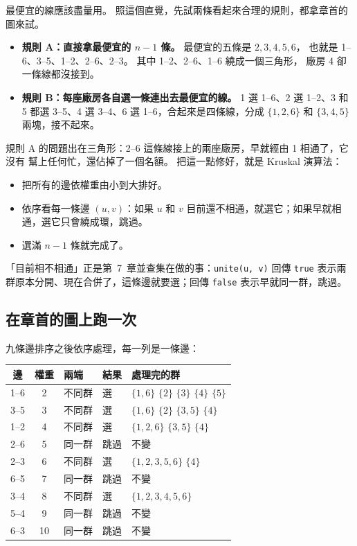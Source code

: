 最便宜的線應該盡量用。 照這個直覺，先試兩條看起來合理的規則，都拿章首的圖來試。

\begin{itemize}
\item \textbf{規則 A：直接拿最便宜的 $n - 1$ 條。} 最便宜的五條是 $2, 3, 4, 5, 6$，
也就是 1--6、3--5、1--2、2--6、2--3。 其中 1--2、2--6、1--6 繞成一個三角形，
廠房 4 卻一條線都沒接到。
\item \textbf{規則 B：每座廠房各自選一條連出去最便宜的線。} 1 選 1--6、2 選
1--2、3 和 5 都選 3--5、4 選 3--4、6 選 1--6，合起來是四條線，分成
$\{1, 2, 6\}$ 和 $\{3, 4, 5\}$ 兩塊，接不起來。
\end{itemize}

規則 A 的問題出在三角形：2--6 這條線接上的兩座廠房，早就經由 1 相通了，它沒有
幫上任何忙，還佔掉了一個名額。 把這一點修好，就是 Kruskal 演算法：

\begin{itemize}
\item 把所有的邊依權重由小到大排好。
\item 依序看每一條邊 $(u, v)$：如果 $u$ 和 $v$ 目前還不相通，就選它；如果早就相
通，選它只會繞成環，跳過。
\item 選滿 $n - 1$ 條就完成了。
\end{itemize}

「目前相不相通」正是第~7~章並查集在做的事：\texttt{unite(u, v)} 回傳
\texttt{true} 表示兩群原本分開、現在合併了，這條邊就要選；回傳 \texttt{false}
表示早就同一群，跳過。

\subsection{在章首的圖上跑一次}

九條邊排序之後依序處理，每一列是一條邊：

\begin{center}
\begin{tabular}{cclll}
\toprule
邊 & 權重 & 兩端 & 結果 & 處理完的群 \\
\midrule
1--6 & 2 & 不同群 & 選 & $\{1, 6\}$ $\{2\}$ $\{3\}$ $\{4\}$ $\{5\}$ \\
3--5 & 3 & 不同群 & 選 & $\{1, 6\}$ $\{2\}$ $\{3, 5\}$ $\{4\}$ \\
1--2 & 4 & 不同群 & 選 & $\{1, 2, 6\}$ $\{3, 5\}$ $\{4\}$ \\
2--6 & 5 & 同一群 & 跳過 & 不變 \\
2--3 & 6 & 不同群 & 選 & $\{1, 2, 3, 5, 6\}$ $\{4\}$ \\
6--5 & 7 & 同一群 & 跳過 & 不變 \\
3--4 & 8 & 不同群 & 選 & $\{1, 2, 3, 4, 5, 6\}$ \\
5--4 & 9 & 同一群 & 跳過 & 不變 \\
6--3 & 10 & 同一群 & 跳過 & 不變 \\
\bottomrule
\end{tabular}
\end{center}

